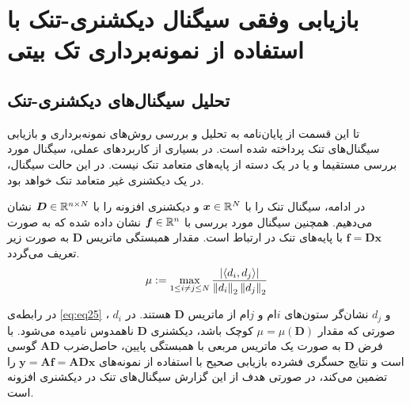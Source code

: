 \chapter{بازیابی وفقی سیگنال دیکشنری-تنک با استفاده از نمونه‌برداری تک بیتی}
\label{ch:main}
\newpage
\section{تحلیل سیگنال‌های دیکشنری-تنک}
تا این قسمت از پایان‌نامه به تحلیل و بررسی روش‌های نمونه‌برداری و بازیابی سیگنال‌های تنک پرداخته شده است. در بسیاری از کاربرد‌های عملی، سیگنال مورد بررسی مستقیما و یا در یک دسته از پایه‌های متعامد تنک نیست. در این حالت سیگنال، در یک دیکشنری غیر متعامد تنک خواهد بود.

در ادامه، سیگنال تنک را با
$ \bm{x}\in \mathbb{R}^N $
و دیکشنری افزونه
را با 
$ \bm{D}\in \mathbb{R}^{n\times N} $
نشان می‌دهیم. همچنین سیگنال مورد بررسی با
$ \bm{f}\in \mathbb{R}^n $
 نشان داده شده که به صورت
 $ \bm{f}=\bm{D}\bm{x} $
 با پایه‌های تنک در ارتباط است. مقدار همبستگی ماتریس 
 $\bm{D}$
 به صورت زیر تعریف می‌گردد.
\begin{align}
\label{eq:eq25}
\mu := \max_{1\leq i\neq j\leq N} \dfrac{| \langle d_{i},d_{j}\rangle|}{\left\lVert d_{i}\right\rVert_{2}\left\lVert d_{j}\right\rVert_{2}}
\end{align}

در رابطه‌ی
\eqref{eq:eq25}
، 
$ d_{i} $
و
$ d_{j} $
نشان‌گر ستون‌های
$i$ام
و
$j$ام
از ماتریس 
$ \bm{D} $
هستند. در صورتی که مقدار
$ \mu = \mu\left(\bm{D}\right) $
کوچک باشد، دیکشنری 
$ \bm{D} $
ناهمدوس
نامیده می‌شود. با فرض
$ \bm{D} $
به صورت یک ماتریس مربعی با همبستگی پایین، حاصل‌ضرب 
$ \bm{A}\bm{D} $
گوسی است و نتایج حسگری فشرده بازیابی صحیح با استفاده از نمونه‌های
$ \bm{y}=\bm{A}\bm{f}=\bm{A}\bm{D}\bm{x} $
را تضمین می‌کند، در صورتی هدف از این گزارش سیگنال‌های تنک در دیکشنری افزونه است.

